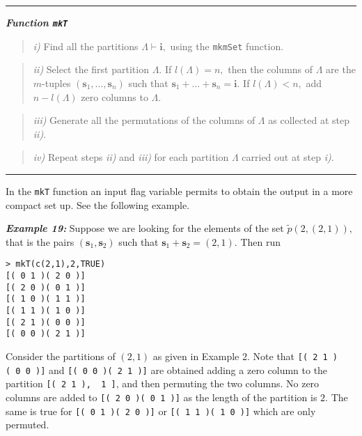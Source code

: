 \noindent

\rule{13cm}{0.4pt}

\textbf{\emph{Function \texttt{mkT}}}

\begin{quote}
\emph{i)} Find all the partitions \(\Lambda \vdash \boldsymbol{i},\)
using the \texttt{mkmSet} function.
\end{quote}

\begin{quote}
\emph{ii)} Select the first partition \(\Lambda.\) If
\(l(\Lambda) = n,\) then the columns of \(\Lambda\) are the \(m\)-tuples
\((\boldsymbol{s}_1, \ldots, \boldsymbol{s}_n)\) such that
\(\boldsymbol{s}_1 + \ldots + \boldsymbol{s}_n = \boldsymbol{i}.\) If
\(l(\Lambda) < n,\) add \(n-l(\Lambda)\) zero columns to \(\Lambda.\)
\end{quote}

\begin{quote}
\emph{iii)} Generate all the permutations of the columns of \(\Lambda\)
as collected at step \emph{ii)}.
\end{quote}

\begin{quote}
\emph{iv)} Repeat steps \emph{ii)} and \emph{iii)} for each partition
\(\Lambda\) carried out at step \emph{i)}.
\end{quote}

\noindent

\rule{13cm}{0.4pt}

In the \texttt{mkT} function an input flag variable permits to obtain
the output in a more compact set up. See the following example.

\hskip-0.5cm\textbf{\emph{Example 19:}} Suppose we are looking for the
elements of the set \(\tilde{p}(2,(2,1)),\) that is the pairs
\((\boldsymbol{s}_1, \boldsymbol{s}_2)\) such that
\(\boldsymbol{s}_1 + \boldsymbol{s}_2 = (2,1).\) Then run

\begin{verbatim}
> mkT(c(2,1),2,TRUE)
[( 0 1 )( 2 0 )]
[( 2 0 )( 0 1 )]
[( 1 0 )( 1 1 )]
[( 1 1 )( 1 0 )]
[( 2 1 )( 0 0 )]
[( 0 0 )( 2 1 )]
\end{verbatim}

Consider the partitions of \((2,1)\) as given in Example 2. Note that
\texttt{{[}(\ 2\ 1\ )(\ 0\ 0\ ){]}} and
\texttt{{[}(\ 0\ 0\ )(\ 2\ 1\ ){]}} are obtained adding a zero column to
the partition \texttt{{[}(\ 2\ 1\ ),\ \ 1\ {]}}, and then permuting the
two columns. No zero columns are added to
\texttt{{[}(\ 2\ 0\ )(\ 0\ 1\ ){]}} as the length of the partition is
\(2.\) The same is true for \texttt{{[}(\ 0\ 1\ )(\ 2\ 0\ ){]}} or
\texttt{{[}(\ 1\ 1\ )(\ 1\ 0\ ){]}} which are only permuted.

